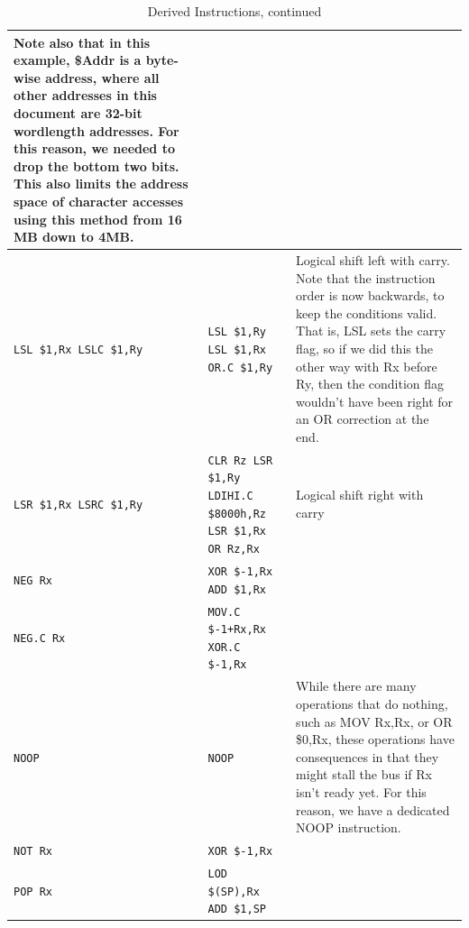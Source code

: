 \documentclass{gqtekspec}
\begin{document}
\begin{table}
\begin{center}
\begin{tabular}{p{1.4in}p{1.5in}p{3in}}
{	Note also that in this example, \$Addr is a byte-wise address, where
	all other addresses in this document are 32-bit wordlength addresses. 
	For this reason,
	we needed to drop the bottom two bits.  This also limits the address
	space of character accesses using this method from 16 MB down to 4MB.}
		\\\hline
\parbox[t]{1.5in}{\tt LSL \$1,Rx\\ LSLC \$1,Ry}
	& \parbox[t]{1.5in}{\tt LSL \$1,Ry \\
	LSL \$1,Rx \\
	OR.C \$1,Ry}
	& Logical shift left with carry.  Note that the
	instruction order is now backwards, to keep the conditions valid.
	That is, LSL sets the carry flag, so if we did this the other way
	with Rx before Ry, then the condition flag wouldn't have been right
	for an OR correction at the end. \\\hline
\parbox[t]{1.5in}{\tt LSR \$1,Rx \\ LSRC \$1,Ry}
	& \parbox[t]{1.5in}{\tt CLR Rz \\
	LSR \$1,Ry \\
	LDIHI.C \$8000h,Rz \\
	LSR \$1,Rx \\
	OR Rz,Rx}
	& Logical shift right with carry \\\hline
{\tt NEG Rx} & \parbox[t]{1.5in}{\tt XOR \$-1,Rx \\ ADD \$1,Rx} & \\\hline
{\tt NEG.C Rx} & \parbox[t]{1.5in}{\tt MOV.C \$-1+Rx,Rx\\XOR.C \$-1,Rx} & \\\hline
{\tt NOOP} & {\tt NOOP} & While there are many
	operations that do nothing, such as MOV Rx,Rx, or OR \$0,Rx, these
	operations have consequences in that they might stall the bus if
	Rx isn't ready yet.  For this reason, we have a dedicated NOOP
	instruction. \\\hline
{\tt NOT Rx } & {\tt XOR \$-1,Rx } & \\\hline
{\tt POP Rx }
	& \parbox[t]{1.5in}{\tt LOD \$(SP),Rx \\ ADD \$1,SP}
	& \\\hline
\end{tabular}
\caption{Derived Instructions, continued}\label{tbl:derived-2}
\end{center}\end{table}
\end{document}
